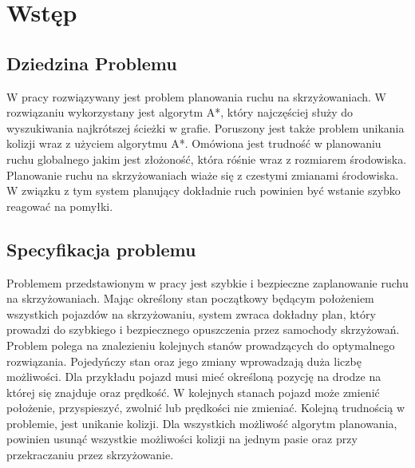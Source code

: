 \chapter{Wstęp}

\section{Dziedzina Problemu}

W pracy rozwiązywany jest problem planowania ruchu na skrzyżowaniach.
\newline
\newline
W rozwiązaniu wykorzystany jest algorytm A*, który najczęściej służy do wyszukiwania najkrótszej ścieżki w grafie.
\newline
\newline
Poruszony jest także problem unikania kolizji wraz z użyciem algorytmu A*.
\newline
\newline
Omówiona jest trudność w planowaniu ruchu globalnego jakim jest złożoność, która róśnie wraz z rozmiarem środowiska.
\newline
\newline
Planowanie ruchu na skrzyżowaniach wiaże się z czestymi zmianami środowiska. W związku z tym system planujący dokładnie ruch powinien być wstanie szybko reagować na pomyłki.

\section{Specyfikacja problemu}

Problemem przedstawionym w pracy jest szybkie i bezpieczne zaplanowanie ruchu na skrzyżowaniach. Mając określony stan początkowy będącym położeniem wszystkich pojazdów na skrzyżowaniu, system zwraca dokładny plan, który prowadzi do szybkiego i bezpiecznego opuszczenia przez samochody skrzyżowań.
\newline
\newline
Problem polega na znalezieniu kolejnych stanów prowadzących do optymalnego rozwiązania. Pojedyńczy stan oraz jego zmiany wprowadzają duża liczbę możliwości.
\newline
\newline
Dla przykładu pojazd musi mieć określoną pozycję na drodze na której się znajduje oraz prędkość. W kolejnych stanach pojazd może zmienić położenie, przyspieszyć, zwolnić lub prędkości nie zmieniać.
\newline
\newline
Kolejną trudnością w problemie, jest unikanie kolizji. Dla wszystkich możliwość algorytm planowania, powinien usunąć wszystkie możliwości kolizji na jednym pasie oraz przy przekraczaniu przez skrzyżowanie.

